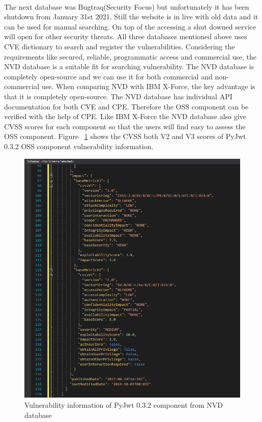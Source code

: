 \paragraph{}
The next database was Bugtraq(Security Focus) but unfortunately it has been shutdown from January 31st 2021\cite{Cat2021}. Still the website is in live with old data and it can be used for manual searching. On top of the accessing a shut downed service will open for other security threats. All three databases mentioned above uses \acs{CVE} dictionary to search and register the vulnerabilities. Considering the requirements like secured, reliable, programmatic access and commercial use, the \acs{NVD} database is a suitable fit for searching vulnerability. The \acs{NVD} database is completely open-source and we can use it for both commercial and non-commercial use. When comparing \acs{NVD} with IBM X-Force, the key advantage is that it is completely open-source. The \acs{NVD} database has individual API documentation for both \acs{CVE} and \acs{CPE}. Therefore the \acs{OSS} component can be verified with the help of \acs{CPE}. Like IBM X-Force the \acs{NVD} database also give \acs{CVSS} scores for each component so that the users will find easy to assess the \acs{OSS} component. Figure ~\ref{fig:nvdOutput} shows the \acs{CVSS} both V2 and V3 scores of PyJwt 0.3.2 \acs{OSS} component vulnerability information. 
\begin{figure}[H]
	\includegraphics[width=15cm]{includes/nvdOutput.PNG}
	\centering
	\caption{Vulnerability information of PyJwt 0.3.2 component from \acs{NVD} database}
	\label{fig:nvdOutput}
\end{figure}

